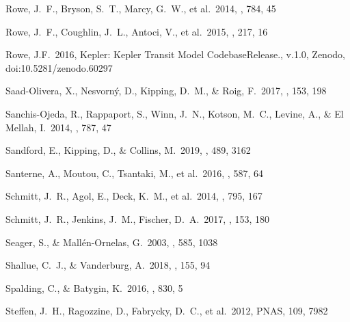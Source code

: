 \documentclass{aastex62}
\begin{document}
\begin{thebibliography}{}

Rowe, J.~F., Bryson, S.~T., Marcy, G.~W., et al.~2014, \apj,  784, 45

Rowe, J.~F., Coughlin, J.~L., Antoci, V., et al.~2015, \apjs,  217, 16

Rowe, J.F.~2016, Kepler: Kepler Transit Model CodebaseRelease., v.1.0, Zenodo, doi:10.5281/zenodo.60297

 Saad-Olivera, X., Nesvorn{\'y}, D., Kipping, D.~M., \& Roig, F.~2017, \aj, 153, 198


 {Sanchis-Ojeda}, R., Rappaport, S.,  Winn, J.~N.,  Kotson, M.~C.,  Levine, A., \&  El Mellah, I.~2014, \apj, 787, 47

 Sandford, E., Kipping, D., \& Collins, M.\ 2019, \mnras, 489, 3162 %

 Santerne, A., Moutou, C., Tsantaki, M., et al.~2016, \aap, 587, 64

 {Schmitt}, J.~R., Agol, E.,  Deck, K.~M., et al.~2014, \apj, 795, 167

 {Schmitt}, J.~R., Jenkins, J.~M., Fischer, D.~A.~2017, \aj, 153, 180
 
 Seager, S., \& Mall{\'e}n-Ornelas, G.~2003, \apj, 585, 1038

 Shallue, C.~J., \& Vanderburg, A.~2018, \aj, 155, 94

 Spalding, C., \& Batygin, K.~2016, \apj, 830, 5

{Steffen}, J.~H., Ragozzine, D., Fabrycky, D.~C., et al.~2012, PNAS, 109, 7982


\end{thebibliography}
\end{document}
